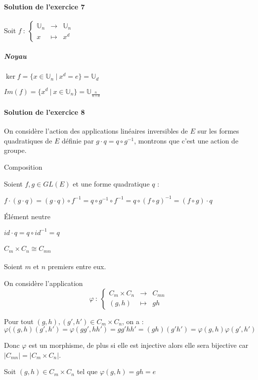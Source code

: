 \documentclass[]{article}
\theoremstyle{remark}
\theoremstyle{definition}
\newcommand{\func}[5]{
#1 ~ : ~ \left\{ \begin{array}{lcl}
	#2 & \longrightarrow & #3 \\
	#4 & \longmapsto & #5
\end{array}
\right.
}
\newenvironment{proofpart}[1]{
	\noindent
	{\boldmath #1}
}{
	\checkmark
}
\begin{document}
\paragraph{Solution de l'exercice 7}

Soit $\func{f}{\mathbb{U}_n}{\mathbb{U}_n}{x}{x^d}$

\subparagraph{Noyau}

$\ker f = \{x \in \mathbb{U}_n ~ | ~ x^d = e \} = \mathbb{U}_d$

$Im(f)=\{x^d ~|~ x \in \mathbb{U}_n\}=\mathbb{U}_{\frac{n}{n \land d}}$

\paragraph{Solution de l'exercice 8}

On considère l'action des applications linéaires inversibles de $E$ sur les formes quadratiques de $E$ définie par $g \cdot q = q \circ g^{-1}$, montrons que c'est une action de groupe.

\begin{proofpart}{Composition}

	Soient $f, g \in GL(E)$ et une forme quadratique $q$ :
	
	$f\cdot(g \cdot q)=(g \cdot q) \circ f^{-1}=q\circ g^{-1}\circ f^{-1}=q \circ (f \circ g)^{-1}=(f \circ g) \cdot q$
\end{proofpart}

\begin{proofpart}{Élément neutre}

	$id \cdot q = q \circ id^{-1} = q$
\end{proofpart}

\paragraph{\boldmath $C_m \times C_n \cong C_{mn}$} Soient $m$ et $n$ premiers entre eux.

On considère l'application
$$\func{\varphi}{C_m \times C_n}{C_{mn}}{(g,h)}{gh}$$

Pour tout $(g, h), (g', h') \in C_m \times C_n$, on a :  $$\varphi((g,h)(g',h')=\varphi(gg',hh')=gg'hh'=(gh)(g'h')=\varphi(g,h)\varphi(g',h')$$

Donc $\varphi$ est un morphisme, de plus si elle est injective alors elle sera bijective car $|C_{mn}| = |C_m \times C_n|$.

Soit $(g,h) \in C_m \times C_n$ tel que $\varphi(g, h) = gh = e$
\end{document}
